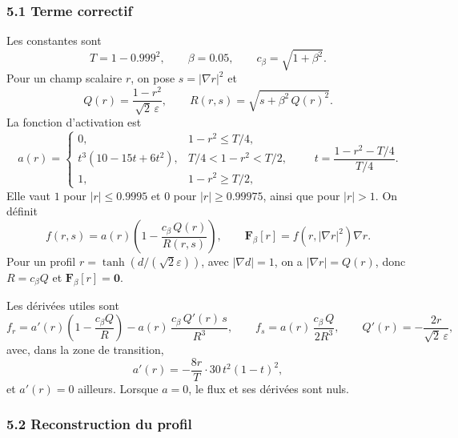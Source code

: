 \subsubsection*{5.1 Terme correctif}

Les constantes sont
\begin{equation}
  T = 1-0.999^{2},
  \qquad
  \beta = 0.05,
  \qquad
  c_\beta = \sqrt{1+\beta^{2}} .
\end{equation}
Pour un champ scalaire $r$, on pose $s = |\nabla r|^{2}$ et
\begin{equation}
  Q(r) = \frac{1-r^{2}}{\sqrt{2}\,\varepsilon},
  \qquad
  R(r,s) = \sqrt{s + \beta^{2}\,Q(r)^{2}} .
\end{equation}
La fonction d'activation est
\begin{equation}\label{cp:activation}
  a(r) =
  \begin{cases}
    0, & 1-r^{2} \le T/4,\\[2pt]
    t^{3}\left(10-15t+6t^{2}\right), & T/4 < 1-r^{2} < T/2,\\[2pt]
    1, & 1-r^{2} \ge T/2,
  \end{cases}
  \qquad
  t = \frac{1-r^{2}-T/4}{T/4} .
\end{equation}
Elle vaut $1$ pour $|r|\le0.9995$ et $0$ pour $|r|\ge0.99975$, ainsi que pour $|r|>1$. On définit
\begin{equation}\label{cp:f}
  f(r,s) = a(r)\left(1 - \frac{c_\beta\,Q(r)}{R(r,s)}\right),
  \qquad
  \mathbf{F}_\beta[r] = f\!\left(r,|\nabla r|^{2}\right)\nabla r .
\end{equation}
Pour un profil $r = \tanh\!\left(d/(\sqrt{2}\varepsilon)\right)$, avec $|\nabla d| = 1$, on a $|\nabla r| = Q(r)$, donc $R = c_\beta Q$ et $\mathbf{F}_\beta[r] = \mathbf{0}$.

Les dérivées utiles sont
\begin{equation}\label{cp:derivees}
  f_r = a'(r)\left(1-\frac{c_\beta Q}{R}\right) - a(r)\,\frac{c_\beta\,Q'(r)\,s}{R^{3}},
  \qquad
  f_s = a(r)\,\frac{c_\beta\,Q}{2R^{3}},
  \qquad
  Q'(r) = -\frac{2r}{\sqrt{2}\,\varepsilon},
\end{equation}
avec, dans la zone de transition,
\begin{equation}
  a'(r) = -\frac{8r}{T}\cdot 30\,t^{2}\left(1-t\right)^{2},
\end{equation}
et $a'(r)=0$ ailleurs. Lorsque $a=0$, le flux et ses dérivées sont nuls.

\subsubsection*{5.2 Reconstruction du profil}

